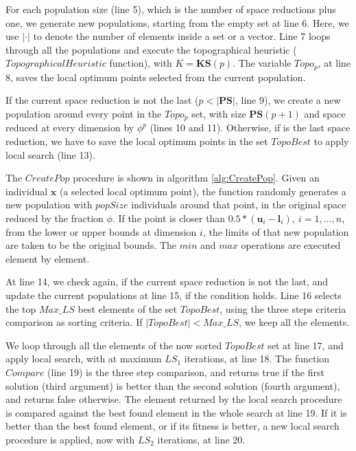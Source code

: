 For each population size (line 5), which is the number of space reductions plus one, we generate new populations, starting from the empty set at line 6. Here, we use $|\cdot|$ to denote the number of elements inside a set or a vector. Line 7 loops through all the populations and execute the topographical heuristic ($TopographicalHeuristic$ function), with $K = \bm{KS}(p)$. The variable $Topo_p$, at line 8, saves the local optimum points selected from the current population.

If the current space reduction is not the last ($p < |\bm{PS}|$, line 9), we create a new population around every point in the $Topo_p$ set, with size $\bm{PS}(p + 1)$ and space reduced at every dimension by $\phi^p$ (lines 10 and 11). Otherwise, if is the last space reduction, we have to save the local optimum points in the set $TopoBest$ to apply local search (line 13).





The $CreatePop$ procedure is shown in algorithm \ref{alg:CreatePop}. Given an individual $\bm{x}$ (a selected local optimum point), the function randomly generates a new population with $popSize$ individuals around that point, in the original space reduced by the fraction $\phi$. If the point is closer than $0.5 * (\bm{u}_i - \bm{l}_i), \ i = 1, ..., n$, from the lower or upper bounds at dimension $i$, the limits of that new population are taken to be the original bounds. The $min$ and $max$ operations are executed element by element.


At line 14, we check again, if the current space reduction is not the last, and update the current populations at line 15, if the condition holds. Line 16 selects the top $Max\_LS$ best elements of the set $TopoBest$, using the three steps criteria comparison as sorting criteria. If $|TopoBest| < Max\_LS$, we keep all the elements.

We loop through all the elements of the now sorted $TopoBest$ set at line 17, and apply local search, with at maximum $LS_1$ iterations, at line 18. The function $Compare$ (line 19) is the three step comparison, and returns true if the first solution (third argument) is better than the second solution (fourth argument), and returns false otherwise. The element returned by the local search procedure is compared against the best found element in the whole search at line 19. If it is better than the best found element, or if its fitness is better, a new local search procedure is applied, now with $LS_2$ iterations, at line 20.

